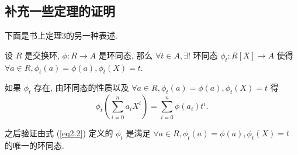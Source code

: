 \documentclass[UTF8]{ctexart}
\begin{document}
\subsection{补充一些定理的证明}
下面是书上定理3的另一种表述.
\begin{theorem}[书上的定理3]\label{t2.1}
    设 $R$ 是交换环, $\phi:R\to A$ 是环同态, 那么 $\forall t\in A,\exists!$ 环同态 $\phi_t:R[X]\to A$ 使得 $\forall a\in R,\phi_t(a)=\phi(a),\phi_t(X)=t$.
\end{theorem}
\begin{thought}
    如果 $\phi_t$ 存在, 由环同态的性质以及 $\forall a\in R,\phi_t(a)=\phi(a),\phi_t(X)=t$ 得
    \begin{equation}\label{eq2.2}
        \phi_t\left(\sum\limits_{i=0}^{n}a_iX^i\right)=\sum\limits_{i=0}^{n}\phi(a_i)t^i.
    \end{equation}

    之后验证由式 (\ref{eq2.2}) 定义的 $\phi_t$ 是满足 $\forall a\in R,\phi_t(a)=\phi(a),\phi_t(X)=t$ 的唯一的环同态.
\end{thought}
\end{document}
